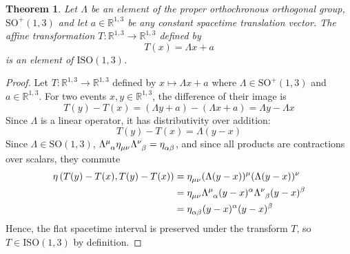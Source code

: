 \documentclass{amsart}
\newtheorem{theorem}{Theorem}[section]
\theoremstyle{definition}
\theoremstyle{remark}
\begin{document}
\begin{theorem}
  Let $\Lambda$ be an element of the proper orthochronous orthogonal group, $\mathrm{SO}^+(1,3)$ and let $a\in\mathbb{R}^{1,3}$ be any constant spacetime translation vector. The affine transformation $T:\mathbb{R}^{1,3}\to\mathbb{R}^{1,3}$ defined by
  \begin{equation*}
    T(x) = \Lambda x + a
  \end{equation*}
  is an element of $\mathrm{ISO}(1,3)$.
\end{theorem}
\begin{proof}
  Let $T:\mathbb{R}^{1,3}\to\mathbb{R}^{1,3}$ defined by $x\mapsto \Lambda x+ a$ where $\Lambda\in\mathrm{SO}^+(1,3)$ and $a\in\mathbb{R}^{1,3}$.
  For two events $x,y\in\mathbb{R}^{1,3}$, the difference of their image is
  \begin{equation*}
    T(y)-T(x) = (\Lambda y+a)-(\Lambda x+a)=\Lambda y-\Lambda x
  \end{equation*}
  Since $\Lambda$ is a linear operator, it has distributivity over addition:
  \begin{equation*}
    T(y)-T(x) = \Lambda (y-x)
  \end{equation*}
  Since $\Lambda\in\mathrm{SO}(1,3)$, $\tensor{\Lambda}{^\mu_\alpha}\tensor{\eta}{_\mu_\nu}\tensor{\Lambda}{^\nu_\beta}=\tensor{\eta}{_\alpha_\beta}$, and since all products are contractions over scalars, they commute
  \begin{align*}
    \eta\left(T(y)-T(x),T(y)-T(x)\right)&=\tensor{\eta}{_\mu_\nu}\tensor{(\Lambda(y-x))}{^\mu}\tensor{(\Lambda(y-x))}{^\nu}\\
    &=\tensor{\eta}{_\mu_\nu}\tensor{\Lambda}{^\mu_\alpha}\tensor{(y-x)}{^\alpha}\tensor{\Lambda}{^\nu_\beta}\tensor{(y-x)}{^\beta}\\
    &=\tensor{\eta}{_\alpha_\beta}\tensor{(y-x)}{^\alpha}\tensor{(y-x)}{^\beta}
  \end{align*}
  Hence, the flat spacetime interval is preserved under the transform $T$, so $T\in\mathrm{ISO}(1,3)$ by definition.
\end{proof}
\end{document}

